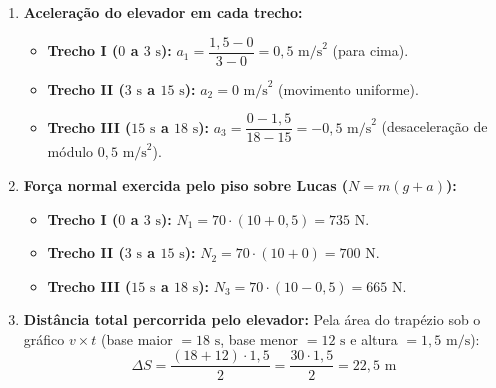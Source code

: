 \documentclass[11pt, a4paper]{article}
\begin{document}
\begin{enumerate}[label=\textbf{(\alph*)}]
    \item \textbf{Aceleração do elevador em cada trecho:}
    \begin{itemize}
        \item \textbf{Trecho I ($0$ a $3\text{ s}$):} $a_1 = \dfrac{1{,}5 - 0}{3 - 0} = 0{,}5\text{ m/s}^2$ (para cima).
        \item \textbf{Trecho II ($3\text{ s}$ a $15\text{ s}$):} $a_2 = 0\text{ m/s}^2$ (movimento uniforme).
        \item \textbf{Trecho III ($15\text{ s}$ a $18\text{ s}$):} $a_3 = \dfrac{0 - 1{,}5}{18 - 15} = -0{,}5\text{ m/s}^2$ (desaceleração de módulo $0{,}5\text{ m/s}^2$).
    \end{itemize}

    \item \textbf{Força normal exercida pelo piso sobre Lucas ($N = m(g + a)$):}
    \begin{itemize}
        \item \textbf{Trecho I ($0$ a $3\text{ s}$):} $N_1 = 70 \cdot (10 + 0{,}5) = 735\text{ N}$.
        \item \textbf{Trecho II ($3\text{ s}$ a $15\text{ s}$):} $N_2 = 70 \cdot (10 + 0) = 700\text{ N}$.
        \item \textbf{Trecho III ($15\text{ s}$ a $18\text{ s}$):} $N_3 = 70 \cdot (10 - 0{,}5) = 665\text{ N}$.
    \end{itemize}

    \item \textbf{Distância total percorrida pelo elevador:}
    Pela área do trapézio sob o gráfico $v \times t$ (base maior $= 18\text{ s}$, base menor $= 12\text{ s}$ e altura $= 1{,}5\text{ m/s}$):
    \[
        \Delta S = \frac{(18 + 12) \cdot 1{,}5}{2} = \frac{30 \cdot 1{,}5}{2} = 22{,}5\text{ m}
    \]
\end{enumerate}
\end{document}
